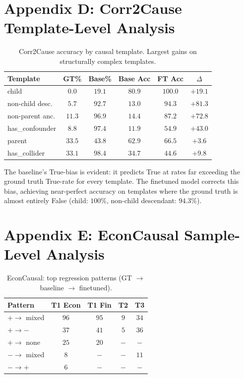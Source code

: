 \documentclass[11pt]{article}
\begin{document}
\section{Appendix D: Corr2Cause Template-Level Analysis}

\begin{table}
\caption{Corr2Cause accuracy by causal template. Largest gains on structurally complex templates.}
\label{tab:corr2cause_templates}
\begin{tabular}{lccccc}
\toprule
Template & GT\% & Base\% & Base Acc & FT Acc & $\Delta$ \\
\midrule
child & $0.0$ & $19.1$ & $80.9$ & $100.0$ & $+19.1$ \\
non-child desc. & $5.7$ & $92.7$ & $13.0$ & $94.3$ & $+81.3$ \\
non-parent anc. & $11.3$ & $96.9$ & $14.4$ & $87.2$ & $+72.8$ \\
has\_confounder & $8.8$ & $97.4$ & $11.9$ & $54.9$ & $+43.0$ \\
parent & $33.5$ & $43.8$ & $62.9$ & $66.5$ & $+3.6$ \\
has\_collider & $33.1$ & $98.4$ & $34.7$ & $44.6$ & $+9.8$ \\
\bottomrule
\end{tabular}
\end{table}

The baseline's True-bias is evident: it predicts True at rates far exceeding the ground truth True-rate for every template. The finetuned model corrects this bias, achieving near-perfect accuracy on templates where the ground truth is almost entirely False (child: $100\%$, non-child descendant: $94.3\%$).

\section{Appendix E: EconCausal Sample-Level Analysis}

\begin{table}
\caption{EconCausal: top regression patterns (GT $\rightarrow$ baseline $\rightarrow$ finetuned).}
\label{tab:econcausal_patterns}
\begin{tabular}{lcccc}
\toprule
Pattern & T1 Econ & T1 Fin & T2 & T3 \\
\midrule
$+ \rightarrow$ mixed & $96$ & $95$ & $9$ & $34$ \\
$+ \rightarrow -$ & $37$ & $41$ & $5$ & $36$ \\
$+ \rightarrow$ none & $25$ & $20$ & $-$ & $-$ \\
$- \rightarrow$ mixed & $8$ & $-$ & $-$ & $11$ \\
$- \rightarrow +$ & $6$ & $-$ & $-$ & $-$ \\
\bottomrule
\end{tabular}
\end{table}
\end{document}
